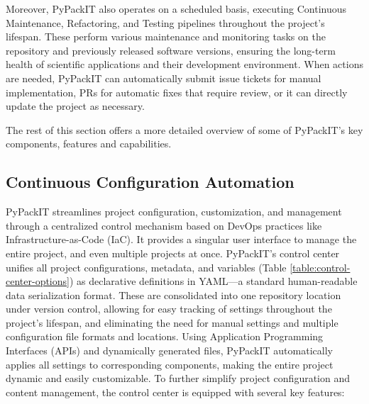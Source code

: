 \documentclass{article}
\begin{document}
Moreover, PyPackIT also operates on a scheduled basis, executing Continuous Maintenance, Refactoring, and Testing pipelines throughout the project's lifespan. These perform various maintenance and monitoring tasks on the repository and previously released software versions, ensuring the long-term health of scientific applications and their development environment. When actions are needed, PyPackIT can automatically submit issue tickets for manual implementation, PRs for automatic fixes that require review, or it can directly update the project as necessary. 

The rest of this section offers a more detailed overview of some of PyPackIT's key components, features and capabilities.

\subsection{Continuous Configuration Automation}
\label{section-controlCenter}

PyPackIT streamlines project configuration, customization, and management through a centralized control mechanism based on DevOps practices like Infrastructure-as-Code (IaC). It provides a singular user interface to manage the entire project, and even multiple projects at once. PyPackIT's control center unifies all project configurations, metadata, and variables (Table \ref{table:control-center-options}) as declarative definitions in YAML—a standard human-readable data serialization format. These are consolidated into one repository location under version control, allowing for easy tracking of settings throughout the project's lifespan, and eliminating the need for manual settings and multiple configuration file formats and locations. Using Application Programming Interfaces (APIs) and dynamically generated files, PyPackIT automatically applies all settings to corresponding components, making the entire project dynamic and easily customizable. To further simplify project configuration and content management, the control center is equipped with several key features:
\end{document}
